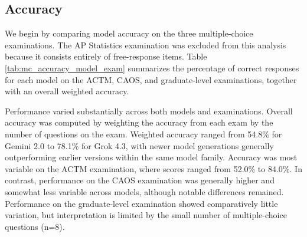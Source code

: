 \documentclass[APA,LATO2COL]{WileyNJDv5}
\begin{document}
\subsection{Accuracy}\label{sec:accuracy}

We begin by comparing model accuracy on the three multiple-choice examinations. The AP Statistics examination was excluded from this analysis because it consists entirely of free-response items. Table \ref{tab:mc_accuracy_model_exam} summarizes the percentage of correct responses for each model on the ACTM, CAOS, and graduate-level examinations, together with an overall weighted accuracy.

Performance varied substantially across both models and examinations. Overall accuracy was computed by weighting the accuracy from each exam by the number of questions on the exam. Weighted accuracy ranged from 54.8\% for Gemini 2.0 to 78.1\% for Grok 4.3, with newer model generations generally outperforming earlier versions within the same model family. Accuracy was most variable on the ACTM examination, where scores ranged from 52.0\% to 84.0\%. In contrast, performance on the CAOS examination was generally higher and somewhat less variable across models, although notable differences remained. Performance on the graduate-level examination showed comparatively little variation, but interpretation is limited by the small number of multiple-choice questions (n=8).
\end{document}
